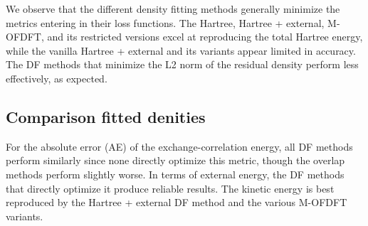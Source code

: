 We observe that the different density fitting methods generally minimize the metrics entering in their loss functions. The Hartree, Hartree + external, M-OFDFT, and its restricted versions excel at reproducing the total Hartree energy, while the vanilla Hartree + external and its variants appear limited in accuracy. The DF methods that minimize the L2 norm of the residual density perform less effectively, as expected.
\subsection{Comparison fitted denities}
For the absolute error (AE) of the exchange-correlation energy, all DF methods perform similarly since none directly optimize this metric, though the overlap methods perform slightly worse. In terms of external energy, the DF methods that directly optimize it produce reliable results. The kinetic energy is best reproduced by the Hartree + external DF method and the various M-OFDFT variants.
